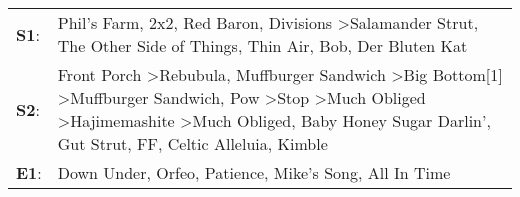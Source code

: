 \begin{supertabular}{p{0.03\textwidth}p{0.92\textwidth}}
 \textbf{S1}:  &                                                                                                                                                                                                                                                                                                                                 Phil's Farm\textsuperscript{}, \enspace 2x2\textsuperscript{}, \enspace Red Baron\textsuperscript{}, \enspace Divisions\textsuperscript{} \textgreater \enspace Salamander Strut\textsuperscript{}, \enspace The Other Side of Things\textsuperscript{}, \enspace Thin Air\textsuperscript{}, \enspace Bob\textsuperscript{}, \enspace Der Bluten Kat\textsuperscript{}  \enspace  \\
 \textbf{S2}:  &  Front Porch\textsuperscript{} \textgreater \enspace Rebubula\textsuperscript{}, \enspace Muffburger Sandwich\textsuperscript{} \textgreater \enspace Big Bottom[1]\textsuperscript{} \textgreater \enspace Muffburger Sandwich\textsuperscript{}, \enspace Pow\textsuperscript{} \textgreater \enspace Stop\textsuperscript{} \textgreater \enspace Much Obliged\textsuperscript{} \textgreater \enspace Hajimemashite\textsuperscript{} \textgreater \enspace Much Obliged\textsuperscript{}, \enspace Baby Honey Sugar Darlin'\textsuperscript{}, \enspace Gut Strut\textsuperscript{}, \enspace FF\textsuperscript{}, \enspace Celtic Alleluia\textsuperscript{}, \enspace Kimble\textsuperscript{}  \enspace  \\
 \textbf{E1}:  &                                                                                                                                                                                                                                                                                                                                                                                                                                                                                                                     Down Under\textsuperscript{}, \enspace Orfeo\textsuperscript{}, \enspace Patience\textsuperscript{}, \enspace Mike's Song\textsuperscript{}, \enspace All In Time\textsuperscript{}  \enspace  \\
\end{supertabular}
